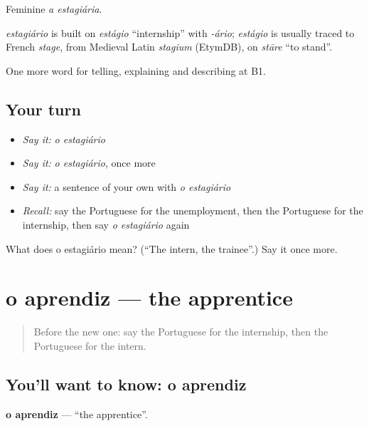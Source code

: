 Feminine \emph{a estagiária}.

\begin{cousinweb}
\emph{estagiário} is built on \emph{estágio} \textquotedblleft{}internship\textquotedblright{} with \emph{-ário}; \emph{estágio} is usually traced to French \emph{stage}, from Medieval Latin \emph{stagium} (EtymDB), on \emph{stāre} \textquotedblleft{}to stand\textquotedblright{}.
\end{cousinweb}

\begin{grammarlens}[title={What you've built}]
One more word for telling, explaining and describing at B1.
\end{grammarlens}

\subsection*{Your turn}
\begin{itemize}
\raggedright
  \item \emph{Say it:} \emph{o estagiário}
  \item \emph{Say it:} \emph{o estagiário}, once more
  \item \emph{Say it:} a sentence of your own with \emph{o estagiário}
  \item \emph{Recall:} say the Portuguese for the unemployment, then the Portuguese for the internship, then say \emph{o estagiário} again
\end{itemize}

\begin{tcolorbox}[breakable,colback=teal!4,colframe=teal!35!black,title={Before you move on}]
What does o estagiário mean? (\textquotedblleft{}The intern, the trainee\textquotedblright{}.) Say it once more.
\end{tcolorbox}
\section[o aprendiz]{o aprendiz — the apprentice}

\label{lesson:PT-C357-aprendiz}



\begin{quote}
Before the new one: say the Portuguese for the internship, then the Portuguese for the intern.
\end{quote}

\subsection*{You'll want to know: o aprendiz}
\textbf{o aprendiz} — \textquotedblleft{}the apprentice\textquotedblright{}.

